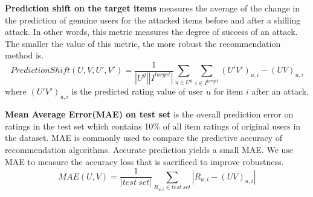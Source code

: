 \documentclass[master,english,final]{kaist-ucs}
\begin{document}
\textbf{Prediction shift on the target items} measures the average of the change in the prediction of genuine users for the attacked items before and after a shilling attack.
In other words, this metric measures the degree of success of an attack.
The smaller the value of this metric, the more robust the recommendation method is.
\begin{equation}
PredictionShift(U,V,U',V') = \frac{1}{|U^g||I^{target}|} \sum_{u \in U^g} \sum_{i \in I^{target}} (U'V')_{u,i}-(UV)_{u,i}
\end{equation}
where $(U'V')_{u,i}$ is the predicted rating value of user $u$ for item $i$ after an attack.

\textbf{Mean Average Error(MAE) on test set} is the overall prediction error on ratings in the test set which contains 10\% of all item ratings of original users in the dataset.
MAE is commonly used to compare the predictive accuracy of recommendation algorithms.
Accurate prediction yields a small MAE.
We use MAE to measure the accuracy loss that is sacrificed to improve robustness.
\begin{equation}
MAE(U,V) = \frac{1}{|test\ set|} \sum_{R_{u,i} \in test\ set} |R_{u,i}-(UV)_{u,i}|
\end{equation}
\end{document}
